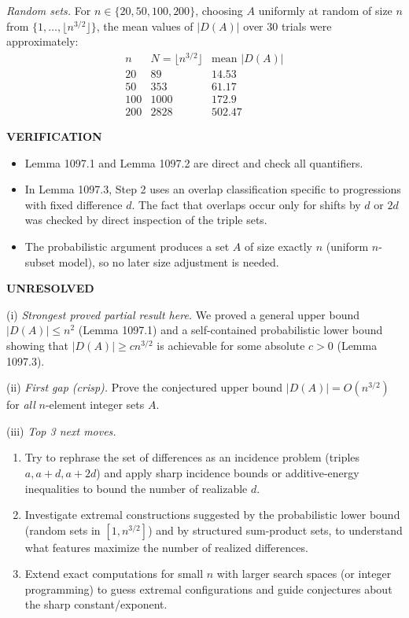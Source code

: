 \smallskip
\noindent
\emph{Random sets.} For $n\in\{20,50,100,200\}$, choosing $A$ uniformly at random of size $n$ from $\{1,\dots,\lfloor n^{3/2}\rfloor\}$, the mean values of $|D(A)|$ over $30$ trials were approximately:
\[
\begin{array}{r|r|r}
 n & N=\lfloor n^{3/2}\rfloor & \text{mean }|D(A)| \\\hline
 20&89&14.53\\
 50&353&61.17\\
 100&1000&172.9\\
 200&2828&502.47
\end{array}
\]

\medskip
\noindent\textbf{VERIFICATION}

\smallskip
\noindent
\begin{itemize}
\item Lemma 1097.1 and Lemma 1097.2 are direct and check all quantifiers.
\item In Lemma 1097.3, Step 2 uses an overlap classification specific to progressions with fixed difference $d$. The fact that overlaps occur only for shifts by $d$ or $2d$ was checked by direct inspection of the triple sets.
\item The probabilistic argument produces a set $A$ of size exactly $n$ (uniform $n$-subset model), so no later size adjustment is needed.
\end{itemize}

\medskip
\noindent\textbf{UNRESOLVED}

\smallskip
\noindent
(i) \emph{Strongest proved partial result here.}
We proved a general upper bound $|D(A)|\le n^2$ (Lemma 1097.1) and a self-contained probabilistic lower bound showing that $|D(A)|\ge c n^{3/2}$ is achievable for some absolute $c>0$ (Lemma 1097.3).

\smallskip
\noindent
(ii) \emph{First gap (crisp).}
Prove the conjectured upper bound $|D(A)|=O(n^{3/2})$ for \emph{all} $n$-element integer sets $A$.

\smallskip
\noindent
(iii) \emph{Top 3 next moves.}
\begin{enumerate}
\item Try to rephrase the set of differences as an incidence problem (triples $a,a+d,a+2d$) and apply sharp incidence bounds or additive-energy inequalities to bound the number of realizable $d$.
\item Investigate extremal constructions suggested by the probabilistic lower bound (random sets in $[1,n^{3/2}]$) and by structured sum-product sets, to understand what features maximize the number of realized differences.
\item Extend exact computations for small $n$ with larger search spaces (or integer programming) to guess extremal configurations and guide conjectures about the sharp constant/exponent.
\end{enumerate}

